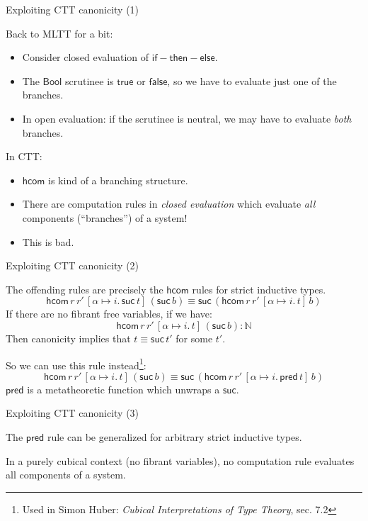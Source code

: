 \documentclass[dvipsnames]{beamer}
\newcommand{\ms}[1]{\mathsf{#1}}
\newcommand{\mbb}[1]{\mathbb{#1}}
\newcommand{\suc}{\ms{suc}}
\newcommand{\Bool}{\ms{Bool}}
\newcommand{\true}{\ms{true}}
\newcommand{\false}{\ms{false}}
\newcommand{\hcom}{\ms{hcom}}
\begin{document}
\begin{frame}{Exploiting CTT canonicity (1)}

Back to MLTT for a bit:
\begin{itemize}
 \item Consider closed evaluation of $\ms{if}\!-\!\ms{then}\!-\!\ms{else}$.
 \item The $\Bool$ scrutinee is $\true$ or $\false$, so we have to evaluate just
   one of the branches.
 \item In open evaluation: if the scrutinee is neutral, we may have to evaluate \emph{both}
       branches.
\end{itemize}
\vspace{1em}
\pause

In CTT:
\begin{itemize}
 \item $\hcom$ is kind of a branching structure.
 \pause
 \item There are computation rules in \emph{closed evaluation} which evaluate \emph{all}
       components (``branches'') of a system!
 \pause
 \item This is bad.
\end{itemize}

\end{frame}

\begin{frame}{Exploiting CTT canonicity (2)}

The offending rules are precisely the $\hcom$ rules for strict inductive types.
\[ \hcom\,r\,r'\,[\alpha \mapsto i.\,\suc\,t]\,(\suc\,b) \equiv
   \suc\,(\hcom\,r\,r'\,[\alpha \mapsto i.\,t]\,b) \]
\pause
If there are no fibrant free variables, if we have:
\[ \hcom\,r\,r'\,[\alpha \mapsto i.\,t]\,(\suc\,b) : \mbb{N} \]
Then canonicity implies that $t \equiv \suc\,t'$ for some $t'$.
\vspace{0.5em}
\pause

So we can use this rule instead\footnote<3->{Used in Simon Huber: \emph{Cubical Interpretations of Type Theory}, sec. 7.2}:
\[ \hcom\,r\,r'\,[\alpha \mapsto i.\,t]\,(\suc\,b) \equiv
   \suc\,(\hcom\,r\,r'\,[\alpha \mapsto i.\,\ms{pred}\,t]\,b) \]
$\ms{pred}$ is a metatheoretic function which unwraps a $\suc$.
\end{frame}

\begin{frame}{Exploiting CTT canonicity (3)}

The $\ms{pred}$ rule can be generalized for arbitrary strict inductive types.
\vspace{1em}
\pause

\begin{block}{}
In a purely cubical context (no fibrant variables), no computation rule evaluates
all components of a system.
\end{block}

\end{frame}
\end{document}
